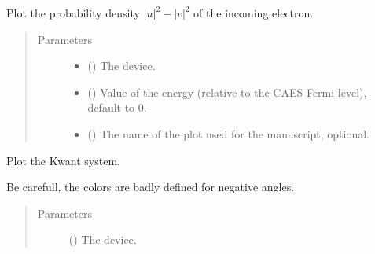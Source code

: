 \documentclass[letterpaper,10pt,english]{sphinxmanual}
\begin{document}
\begin{fulllineitems}
\label{\detokenize{modules:modules.utils.plot_density}}
\pysigstartsignatures
{}
\pysigstopsignatures
\sphinxAtStartPar
Plot the probability density \(|u|^2 - |v|^2\) of the incoming electron.
\begin{quote}\begin{description}
\item[{Parameters}] \leavevmode\begin{itemize}
\item {} 
\sphinxAtStartPar
{} () \textendash{} The device.

\item {} 
\sphinxAtStartPar
{} () \textendash{} Value of the energy (relative to the CAES Fermi level), default to 0.

\item {} 
\sphinxAtStartPar
{} () \textendash{} The name of the plot used for the manuscript, optional.

\end{itemize}

\end{description}\end{quote}

\end{fulllineitems}


\begin{fulllineitems}
\label{\detokenize{modules:modules.utils.plot_device}}
\pysigstartsignatures
{}
\pysigstopsignatures
\sphinxAtStartPar
Plot the Kwant system.

\sphinxAtStartPar
Be carefull, the colors are badly defined for negative angles.
\begin{quote}\begin{description}
\item[{Parameters}] \leavevmode
\sphinxAtStartPar
{} () \textendash{} The device.

\end{description}\end{quote}

\end{fulllineitems}
\end{document}
